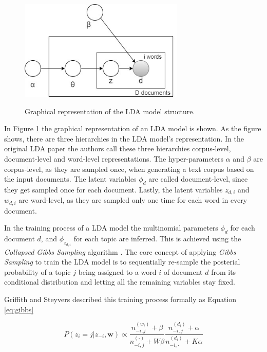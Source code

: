             \begin{figure}[!ht]
              \centering
              \includegraphics[width=0.7\textwidth]{figures/LDA_graphical.jpg}\\
              \caption{Graphical representation of the LDA model structure.}
              \label{fig:LDA_graph}
            \end{figure}
            
            In Figure \ref{fig:LDA_graph} the graphical representation of an LDA model is shown. As the figure shows, there are three hierarchies in the LDA model's representation. In the original LDA paper \cite{blei2003latent} the authors call these three hierarchies corpus-level, document-level and word-level representations. The hyper-parameters $\alpha$ and $\beta$ are corpus-level, as they are sampled once, when generating a text corpus based on the input documents. The latent variables $\phi_d$ are called document-level, since they get sampled once for each document. Lastly, the latent variables $z_{d,i}$ and $w_{d,i}$ are word-level, as they are  sampled only one time for each word in every document.
            
            In the training process of a LDA model the multinomial parameters $\phi_d$ for each document $d$, and $\phi_{z_{d,i}}$ for each topic are inferred. This is achieved using the \emph{Collapsed Gibbs Sampling} algorithm \cite{griffiths2004finding}. The core concept of applying \emph{Gibbs Sampling} to train the LDA model is to sequentially re-sample the posterial probability of a topic $j$ being assigned to a word $i$ of document $d$ from its conditional distribution and letting all the remaining variables stay fixed.
            
            Griffith and Steyvers \cite{griffiths2004finding} described this training process formally as Equation \ref{eq:gibbs}
            
            \begin{equation} \label{eq:gibbs}
                P(z_i = j| \textbf{$z_{-i}$}, \textbf{w}) \propto \frac{n_{-i,j}^{(w_i)} + \beta}{n_{-i,j}^{(\cdot)} + W \beta} \frac{n_{-i,j}^{(d_i)} + \alpha}{n_{-i,\cdot}^{(d_i)} + K \alpha}
            \end{equation}
            
